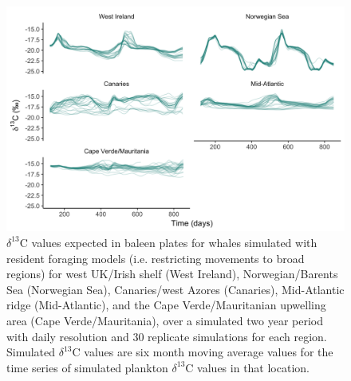 \documentclass[a4paper,10pt]{article}
\begin{document}
  \begin{figure}[!htbp]
    \centering
      \includegraphics[width=\linewidth]{figures/Figure-S4-regions-d13C.png}
      \caption{$\delta^{13}$C values expected in baleen plates for whales simulated with resident foraging models (i.e. restricting movements to broad regions) for west UK/Irish shelf (West Ireland), Norwegian/Barents Sea (Norwegian Sea), Canaries/west Azores (Canaries), Mid-Atlantic ridge (Mid-Atlantic), and the Cape Verde/Mauritanian upwelling area (Cape Verde/Mauritania), over a simulated two year period with daily resolution and 30 replicate simulations for each region. 
      Simulated $\delta^{13}$C values are six month moving average values for the time series of simulated plankton $\delta^{13}$C values in that location.}
      \label{figs4}
  \end{figure}

\newpage
\end{document}
